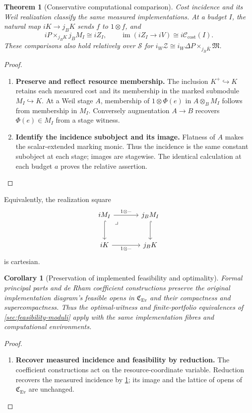 \documentclass[11pt,a4paper]{article}
\numberwithin{algorithm}{section}
\numberwithin{equation}{section}
\newtheorem{theorem}{Theorem}[section]
\newtheorem{corollary}[corollary]{Corollary}
\theoremstyle{definition}
\theoremstyle{remark}
\theoremstyle{plain}
\newcommand{\incl}{\hookrightarrow}
\newcommand{\Ev}{{\operatorname{Ev}}}
\newcommand{\im}{\operatorname{im}}
\newcommand{\CostClass}{\mathcal C_{\mathrm{cost}}}
\newcommand{\Cplx}{\mathfrak C_{\Ev}}
\theoremstyle{definition}
\theoremstyle{plain}
\begin{document}
\begin{theorem}[Conservative computational comparison]
\label{thm:incidence}
Cost incidence and its Weil realization classify the same
measured implementations. At a budget $I$, the natural
map $iK\to j_BK$ sends $f$ to $1\otimes f$, and
\[
 iP\times_{j_BK}j_BM_I\cong iZ_I,
 \qquad \im(iZ_I\to iV)\cong i\CostClass(I).
\]
These comparisons also hold relatively over $\mathscr S$ for
$i_W\mathscr Z\cong i_W\Delta P\times_{j_{\bar B}\bar K}\mathfrak M$.
\end{theorem}
\begin{proof}\leavevmode
\begin{enumerate}[leftmargin=*,align=left]
\item \textbf{Preserve and reflect resource membership.}
The inclusion $K^+\incl K$ retains each measured cost and
its membership in the marked submodule $M_I\incl K$. At a Weil stage
$A$, membership of $1\otimes\Phi(e)$ in $A\otimes_BM_I$
follows from membership in $M_I$. Conversely augmentation
$A\to B$ recovers $\Phi(e)\in M_I$ from a stage witness.

\item \textbf{Identify the incidence subobject and its image.}
Flatness of $A$ makes the scalar-extended marking monic.
Thus the incidence is the same constant subobject at each
stage; images are stagewise. The identical calculation at
each budget $a$ proves the relative assertion.
\end{enumerate}
\end{proof}


Equivalently, the realization square
\begin{equation}\label{eq:cat-conservative-realization}
\begin{tikzcd}[column sep=large,row sep=large]
 iM_I \arrow[dr,phantom,"\lrcorner",very near start] \arrow[r,"{1\otimes-}"] \arrow[d,hook] & j_BM_I \arrow[d,hook]\\
 iK \arrow[r,"{1\otimes-}"'] & j_BK
\end{tikzcd}
\end{equation}
is cartesian.

\begin{corollary}[Preservation of implemented feasibility and optimality]
\label{sec:formal-implementation-boundary}
\label{prop:formal-optimization-conservative}
Formal principal parts and de Rham coefficient constructions preserve
the original implementation diagram's feasible opens in $\Cplx$ and
their compactness and supercompactness. Thus the optimal-witness and
finite-portfolio equivalences of \cref{sec:feasibility-moduli} apply
with the same implementation fibres and computational environments.
\end{corollary}
\begin{proof}\leavevmode
\begin{enumerate}[leftmargin=*,align=left]
\item \textbf{Recover measured incidence and feasibility by reduction.}
The coefficient constructions act on the resource-coordinate variable.
Reduction recovers the measured incidence by \cref{thm:incidence};
its image and the lattice of opens of $\Cplx$ are unchanged.
\end{enumerate}
\end{proof}
\end{document}
